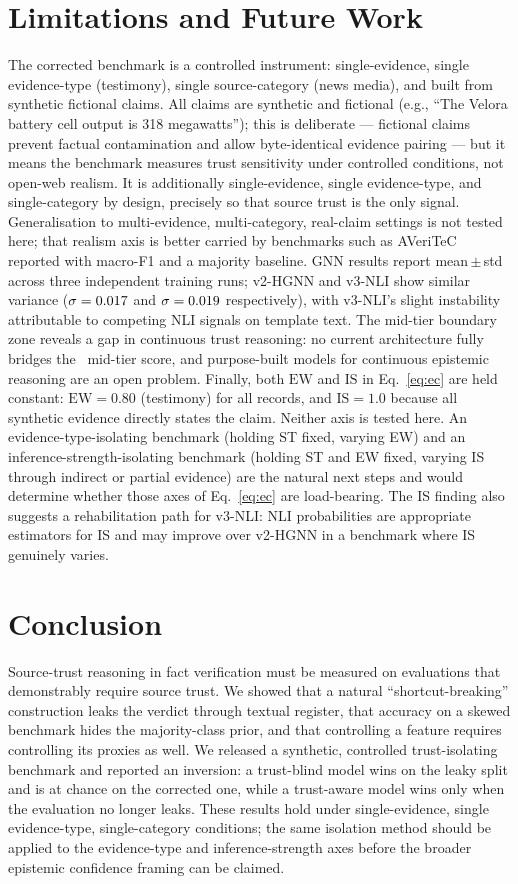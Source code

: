 \documentclass[conference]{IEEEtran}
\begin{document}
\section{Limitations and Future Work}
\label{sec:limitations}
The corrected benchmark is a controlled instrument: single-evidence, single evidence-type (testimony), single source-category (news media), and built from synthetic fictional claims. All claims are synthetic and fictional (e.g., ``The Velora battery cell output is 318 megawatts''); this is deliberate — fictional claims prevent factual contamination and allow byte-identical evidence pairing — but it means the benchmark measures trust sensitivity under controlled conditions, not open-web realism. It is additionally single-evidence, single evidence-type, and single-category by design, precisely so that source trust is the only signal. Generalisation to multi-evidence, multi-category, real-claim settings is not tested here; that realism axis is better carried by benchmarks such as AVeriTeC reported with macro-F1 and a majority baseline. GNN results report mean\,$\pm$\,std across three independent training runs; v2-HGNN and v3-NLI show similar variance ($\sigma=0.017$ and $\sigma=0.019$ respectively), with v3-NLI's slight instability attributable to competing NLI signals on template text. The mid-tier boundary zone reveals a gap in continuous trust reasoning: no current architecture fully bridges the \MidTierMF\ mid-tier score, and purpose-built models for continuous epistemic reasoning are an open problem. Finally, both $\mathrm{EW}$ and $\mathrm{IS}$ in Eq.~\eqref{eq:ec} are held constant: $\mathrm{EW}=0.80$ (testimony) for all records, and $\mathrm{IS}=1.0$ because all synthetic evidence directly states the claim. Neither axis is tested here. An evidence-type-isolating benchmark (holding ST fixed, varying EW) and an inference-strength-isolating benchmark (holding ST and EW fixed, varying IS through indirect or partial evidence) are the natural next steps and would determine whether those axes of Eq.~\eqref{eq:ec} are load-bearing. The IS finding also suggests a rehabilitation path for v3-NLI: NLI probabilities are appropriate estimators for IS and may improve over v2-HGNN in a benchmark where IS genuinely varies.

\section{Conclusion}
Source-trust reasoning in fact verification must be measured on evaluations that demonstrably require source trust. We showed that a natural ``shortcut-breaking'' construction leaks the verdict through textual register, that accuracy on a skewed benchmark hides the majority-class prior, and that controlling a feature requires controlling its proxies as well. We released a synthetic, controlled trust-isolating benchmark and reported an inversion: a trust-blind model wins on the leaky split and is at chance on the corrected one, while a trust-aware model wins only when the evaluation no longer leaks. These results hold under single-evidence, single evidence-type, single-category conditions; the same isolation method should be applied to the evidence-type and inference-strength axes before the broader epistemic confidence framing can be claimed.
\end{document}
